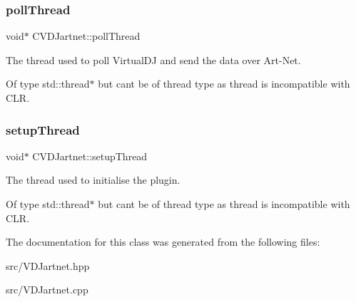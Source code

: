 \subsubsection{\texorpdfstring{poll\+Thread}{pollThread}}
{\footnotesize\ttfamily void$\ast$ C\+V\+D\+Jartnet\+::poll\+Thread\hspace{0.3cm}{\ttfamily [private]}}



The thread used to poll Virtual\+DJ and send the data over Art-\/\+Net. 

Of type std\+::thread$\ast$ but can\textquotesingle{}t be of thread type as thread is incompatible with C\+LR. \mbox{\label{classCVDJartnet_ae1b2c37bca6832820d7a6cd9df718d02}} 
\subsubsection{\texorpdfstring{setup\+Thread}{setupThread}}
{\footnotesize\ttfamily void$\ast$ C\+V\+D\+Jartnet\+::setup\+Thread\hspace{0.3cm}{\ttfamily [private]}}



The thread used to initialise the plugin. 

Of type std\+::thread$\ast$ but can\textquotesingle{}t be of thread type as thread is incompatible with C\+LR. 

The documentation for this class was generated from the following files\+:\begin{DoxyCompactItemize}
\item 
src/V\+D\+Jartnet.\+hpp\item 
src/V\+D\+Jartnet.\+cpp\end{DoxyCompactItemize}
